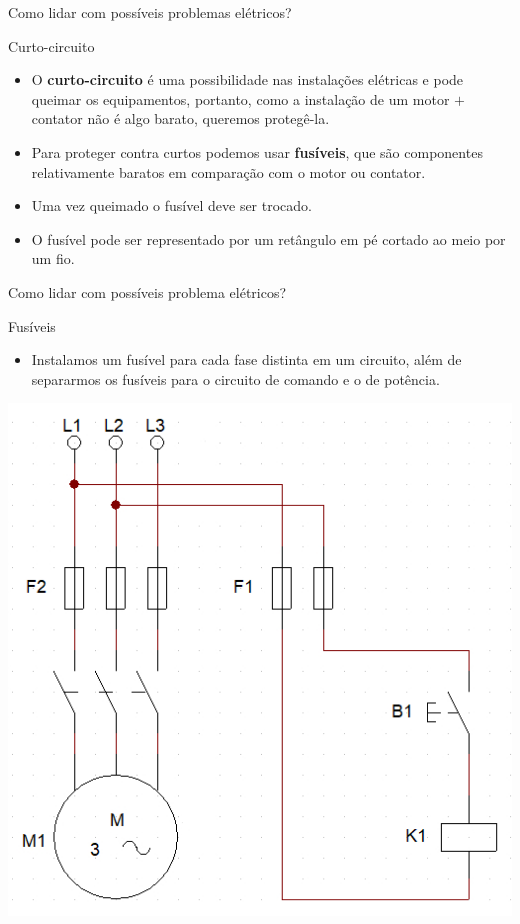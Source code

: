 \begin{frame}{Como lidar com possíveis problemas elétricos?}
	\begin{block}{Curto-circuito}
		\begin{itemize}
			\item O \textbf{curto-circuito} é uma possibilidade nas instalações elétricas e pode queimar os equipamentos, portanto, como a instalação de um motor $ + $ contator não é algo barato, queremos protegê-la.
			\item Para proteger contra curtos podemos usar \textbf{fusíveis}, que são componentes relativamente baratos em comparação com o motor ou contator.
			\item Uma vez queimado o fusível deve ser trocado.
			\item O fusível pode ser representado por um retângulo em pé cortado ao meio por um fio.
		\end{itemize}
	\end{block}
	\begin{center}
	\end{center}
\end{frame}

\begin{frame}{Como lidar com possíveis problema elétricos?}
	\begin{block}{Fusíveis}
		\begin{itemize}
			\item Instalamos um fusível para cada fase distinta em um circuito, além de separarmos os fusíveis para o circuito de comando e o de potência.
		\end{itemize}
	\end{block}
	\centerline{\includegraphics[height=0.6\textheight]{Figuras/Ch05/fig9.jpg}}
\end{frame}

